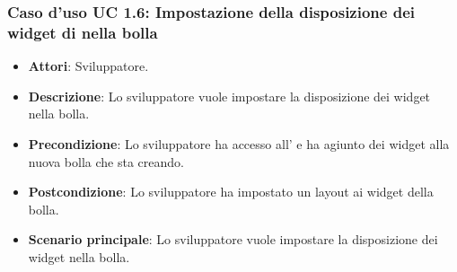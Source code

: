 \subsubsection{Caso d'uso UC 1.6: Impostazione della disposizione dei widget di nella bolla}
\FloatBarrier
\begin{itemize}
\item\textbf{Attori}: Sviluppatore.
\item\textbf{Descrizione}: Lo sviluppatore vuole impostare la disposizione dei widget nella bolla.
\item\textbf{Precondizione}: Lo sviluppatore ha accesso all' e ha agiunto dei widget alla nuova bolla che sta creando.
\item\textbf{Postcondizione}: Lo sviluppatore ha impostato un layout ai widget della bolla.
\item\textbf{Scenario principale}: Lo sviluppatore vuole impostare la disposizione dei widget nella bolla.
\end{itemize}
